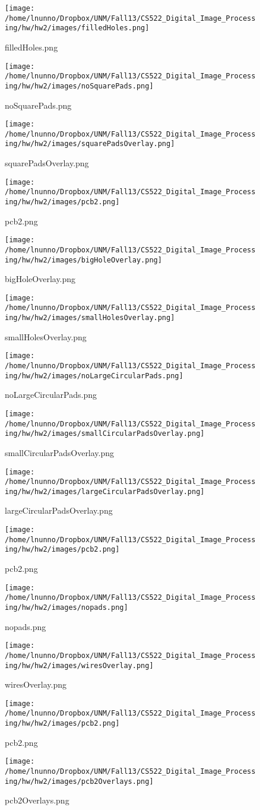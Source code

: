 \documentclass{article}
\begin{document}
    \title{}
    \date{\today}
    \author{\\
      \texttt{}
    }
    \maketitle
    
        
        
    \begin{figure}[p]
	\centering
		\texttt{[image: /home/lnunno/Dropbox/UNM/Fall13/CS522\_Digital\_Image\_Processing/hw/hw2/images/filledHoles.png]}
		\caption{filledHoles.png}
		\texttt{[image: /home/lnunno/Dropbox/UNM/Fall13/CS522\_Digital\_Image\_Processing/hw/hw2/images/noSquarePads.png]}
		\caption{noSquarePads.png}
		\texttt{[image: /home/lnunno/Dropbox/UNM/Fall13/CS522\_Digital\_Image\_Processing/hw/hw2/images/squarePadsOverlay.png]}
		\caption{squarePadsOverlay.png}
			\end{figure}
    \begin{figure}[p]
	\centering
		\texttt{[image: /home/lnunno/Dropbox/UNM/Fall13/CS522\_Digital\_Image\_Processing/hw/hw2/images/pcb2.png]}
		\caption{pcb2.png}
		\texttt{[image: /home/lnunno/Dropbox/UNM/Fall13/CS522\_Digital\_Image\_Processing/hw/hw2/images/bigHoleOverlay.png]}
		\caption{bigHoleOverlay.png}
		\texttt{[image: /home/lnunno/Dropbox/UNM/Fall13/CS522\_Digital\_Image\_Processing/hw/hw2/images/smallHolesOverlay.png]}
		\caption{smallHolesOverlay.png}
			\end{figure}
    \begin{figure}[p]
	\centering
		\texttt{[image: /home/lnunno/Dropbox/UNM/Fall13/CS522\_Digital\_Image\_Processing/hw/hw2/images/noLargeCircularPads.png]}
		\caption{noLargeCircularPads.png}
		\texttt{[image: /home/lnunno/Dropbox/UNM/Fall13/CS522\_Digital\_Image\_Processing/hw/hw2/images/smallCircularPadsOverlay.png]}
		\caption{smallCircularPadsOverlay.png}
		\texttt{[image: /home/lnunno/Dropbox/UNM/Fall13/CS522\_Digital\_Image\_Processing/hw/hw2/images/largeCircularPadsOverlay.png]}
		\caption{largeCircularPadsOverlay.png}
			\end{figure}
    \begin{figure}[p]
	\centering
		\texttt{[image: /home/lnunno/Dropbox/UNM/Fall13/CS522\_Digital\_Image\_Processing/hw/hw2/images/pcb2.png]}
		\caption{pcb2.png}
		\texttt{[image: /home/lnunno/Dropbox/UNM/Fall13/CS522\_Digital\_Image\_Processing/hw/hw2/images/nopads.png]}
		\caption{nopads.png}
		\texttt{[image: /home/lnunno/Dropbox/UNM/Fall13/CS522\_Digital\_Image\_Processing/hw/hw2/images/wiresOverlay.png]}
		\caption{wiresOverlay.png}
			\end{figure}
    \begin{figure}[p]
	\centering
		\texttt{[image: /home/lnunno/Dropbox/UNM/Fall13/CS522\_Digital\_Image\_Processing/hw/hw2/images/pcb2.png]}
		\caption{pcb2.png}
		\texttt{[image: /home/lnunno/Dropbox/UNM/Fall13/CS522\_Digital\_Image\_Processing/hw/hw2/images/pcb2Overlays.png]}
		\caption{pcb2Overlays.png}
			\end{figure}
    
\end{document}
